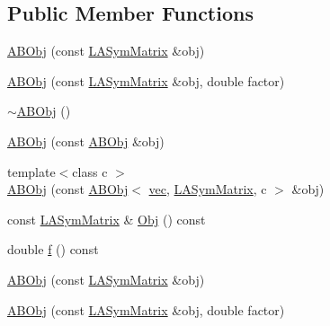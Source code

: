 \subsection*{Public Member Functions}
\begin{DoxyCompactItemize}
\item 
\mbox{\hyperlink{classROOT_1_1Minuit2_1_1ABObj_3_01sym_00_01LASymMatrix_00_01double_01_4_a22738586c6027ada2234556dbab7d406}{A\+B\+Obj}} (const \mbox{\hyperlink{classROOT_1_1Minuit2_1_1LASymMatrix}{L\+A\+Sym\+Matrix}} \&obj)
\item 
\mbox{\hyperlink{classROOT_1_1Minuit2_1_1ABObj_3_01sym_00_01LASymMatrix_00_01double_01_4_a85558830240c4e85aadec196587fe8e5}{A\+B\+Obj}} (const \mbox{\hyperlink{classROOT_1_1Minuit2_1_1LASymMatrix}{L\+A\+Sym\+Matrix}} \&obj, double factor)
\item 
\mbox{\hyperlink{classROOT_1_1Minuit2_1_1ABObj_3_01sym_00_01LASymMatrix_00_01double_01_4_a42b0b36ac55162609ddc385b3631cb6b}{$\sim$\+A\+B\+Obj}} ()
\item 
\mbox{\hyperlink{classROOT_1_1Minuit2_1_1ABObj_3_01sym_00_01LASymMatrix_00_01double_01_4_ad172181f07e897f45d1fe0d7954bb03b}{A\+B\+Obj}} (const \mbox{\hyperlink{classROOT_1_1Minuit2_1_1ABObj}{A\+B\+Obj}} \&obj)
\item 
{\footnotesize template$<$class c $>$ }\\\mbox{\hyperlink{classROOT_1_1Minuit2_1_1ABObj_3_01sym_00_01LASymMatrix_00_01double_01_4_a2632d99f281d85d56d8cd843e58eeac8}{A\+B\+Obj}} (const \mbox{\hyperlink{classROOT_1_1Minuit2_1_1ABObj}{A\+B\+Obj}}$<$ \mbox{\hyperlink{classROOT_1_1Minuit2_1_1vec}{vec}}, \mbox{\hyperlink{classROOT_1_1Minuit2_1_1LASymMatrix}{L\+A\+Sym\+Matrix}}, c $>$ \&obj)
\item 
const \mbox{\hyperlink{classROOT_1_1Minuit2_1_1LASymMatrix}{L\+A\+Sym\+Matrix}} \& \mbox{\hyperlink{classROOT_1_1Minuit2_1_1ABObj_3_01sym_00_01LASymMatrix_00_01double_01_4_a8caec6ce565f8d3729c663088d40233e}{Obj}} () const
\item 
double \mbox{\hyperlink{classROOT_1_1Minuit2_1_1ABObj_3_01sym_00_01LASymMatrix_00_01double_01_4_ad664e57b0a6720ab9c267c662c76b78f}{f}} () const
\item 
\mbox{\hyperlink{classROOT_1_1Minuit2_1_1ABObj_3_01sym_00_01LASymMatrix_00_01double_01_4_a22738586c6027ada2234556dbab7d406}{A\+B\+Obj}} (const \mbox{\hyperlink{classROOT_1_1Minuit2_1_1LASymMatrix}{L\+A\+Sym\+Matrix}} \&obj)
\item 
\mbox{\hyperlink{classROOT_1_1Minuit2_1_1ABObj_3_01sym_00_01LASymMatrix_00_01double_01_4_a85558830240c4e85aadec196587fe8e5}{A\+B\+Obj}} (const \mbox{\hyperlink{classROOT_1_1Minuit2_1_1LASymMatrix}{L\+A\+Sym\+Matrix}} \&obj, double factor)

\end{DoxyCompactItemize}
